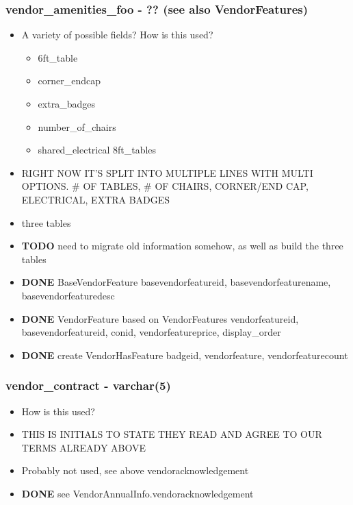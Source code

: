 \documentclass[captions=tablesignature]{scrartcl}
\begin{document}
\subsubsection{vendor\_amenities\_foo - ?? (see also VendorFeatures)}
\label{sec-2-2-11}
\begin{itemize}
\item A variety of possible fields?  How is this  used?
\begin{itemize}
\item 6ft\_table
\item corner\_endcap
\item extra\_badges
\item number\_of\_chairs
\item shared\_electrical 8ft\_tables
\end{itemize}
\item RIGHT NOW IT'S SPLIT INTO MULTIPLE LINES WITH MULTI OPTIONS.  \#
OF TABLES, \# OF CHAIRS, CORNER/END CAP, ELECTRICAL, EXTRA
BADGES
\item three tables
\end{itemize}
\begin{itemize}
\item {\bfseries\sffamily TODO} need to migrate old information somehow, as well as build the three tables
\label{sec-2-2-11-1}
\item {\bfseries\sffamily DONE} BaseVendorFeature
\label{sec-2-2-11-2}
basevendorfeatureid, basevendorfeaturename, basevendorfeaturedesc

\item {\bfseries\sffamily DONE} VendorFeature based on VendorFeatures
\label{sec-2-2-11-3}
vendorfeatureid, basevendorfeatureid, conid, vendorfeatureprice,
display\_order

\item {\bfseries\sffamily DONE} create VendorHasFeature
\label{sec-2-2-11-4}
badgeid, vendorfeature, vendorfeaturecount
\end{itemize}

\subsubsection{vendor\_contract - varchar(5)}
\label{sec-2-2-12}
\begin{itemize}
\item How is this used?
\item THIS IS INITIALS TO STATE THEY READ AND AGREE TO OUR TERMS ALREADY ABOVE
\item Probably not used, see above vendoracknowledgement
\end{itemize}
\begin{itemize}
\item {\bfseries\sffamily DONE} see VendorAnnualInfo.vendoracknowledgement
\label{sec-2-2-12-1}
\end{itemize}
\end{document}
